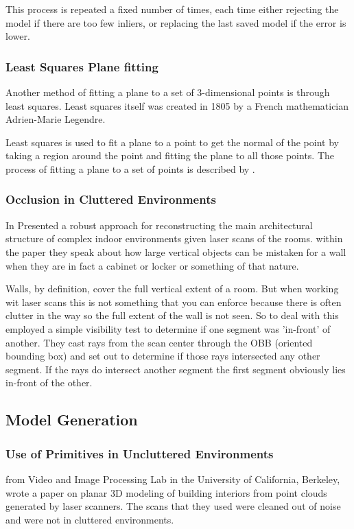 			This process is repeated a fixed number of times, each time either rejecting the model if there are too few inliers, or replacing the last saved model if the error is lower.
		
		\subsubsection{Least Squares Plane fitting}
			Another method of fitting a plane to a set of 3-dimensional points is through least squares. Least squares itself was created in 1805 by a French mathematician Adrien-Marie Legendre.
			
			Least squares is used to fit a plane to a point to get the normal of the point by taking a region around the point and fitting the plane to all those points. The process of fitting a plane to a set of points is described by \cite{schomaker_fit_1959}.
			
	
		\subsubsection{Occlusion in Cluttered Environments}
			In \citeyear{mura_automatic_2014} \citeauthor{mura_automatic_2014} Presented a robust approach for reconstructing the main architectural structure of complex indoor environments given laser scans of the rooms. within the paper they speak about how large vertical objects can be mistaken for a wall when they are in fact a cabinet or locker or something of that nature.
			
			Walls, by definition, cover the full vertical extent of a room. But when working wit laser scans this is not something that you can enforce because there is often clutter in the way so the full extent of the wall is not seen. So to deal with this \citeauthor{mura_automatic_2014} employed a simple visibility test to determine if one segment was 'in-front' of another. They cast rays from the scan center through the OBB (oriented bounding box) and set out to determine if those rays intersected any other segment. If the rays do intersect another segment the first segment obviously lies in-front of the other.
		
	
	\subsection{Model Generation}
		\subsubsection{Use of Primitives in Uncluttered Environments}
			\cite{sanchez_planar_2012} from Video and Image Processing Lab in the University of California, Berkeley, wrote a paper on planar 3D modeling of building interiors from point clouds generated by laser scanners. The scans that they used were cleaned out of noise and were not in cluttered environments.
				
